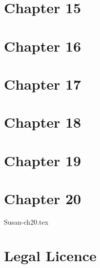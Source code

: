 \documentclass[12pt,twoside,onecolumn,openright,extrafontsizes]{memoir}
\begin{document}
\chapter{Chapter 15}
\lipsum[81-100]
\chapter{Chapter 16}
\lipsum[101-120]
\chapter{Chapter 17}
\lipsum[121-140]
\chapter{Chapter 18}
\lipsum[141-160]
\chapter{Chapter 19}
\lipsum[61-80]
\chapter{Chapter 20}
 {Susan-ch20.tex}




\chapter{Legal Licence}


\end{document}
